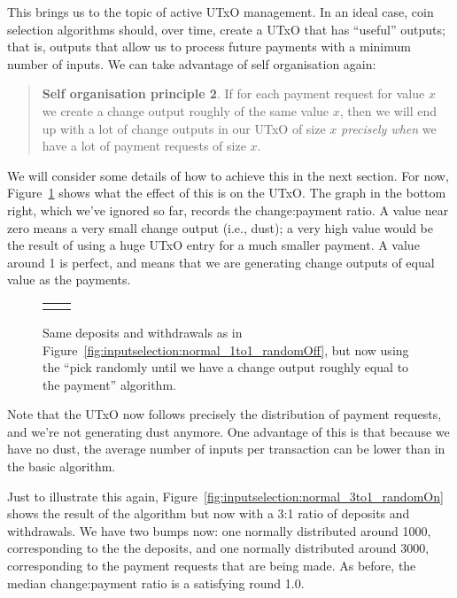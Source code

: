\documentclass{article}
\theoremstyle{definition}{
  \newtheorem{lemma}{Lemma}[section] %
  \newtheorem{definition}[lemma]{Definition}
}
\theoremstyle{theorem}{
  \newtheorem{invariant}[lemma]{Invariant}
  \newtheorem{proofobligation}[lemma]{Proof Obligation}
}
\numberwithin{equation}{lemma}
\begin{document}
This brings us to the topic of active UTxO management. In an ideal case, coin
selection algorithms should, over time, create a UTxO that has ``useful'' outputs;
that is, outputs that allow us to process future payments with a minimum number
of inputs. We can take advantage of self organisation again:
%
\begin{quote}
\textbf{Self organisation principle 2}. If for each payment request for value
$x$ we create a change output roughly of the same value $x$, then we will end up
with a lot of change outputs in our UTxO of size $x$ \emph{precisely when} we
have a lot of payment requests of size $x$.
\end{quote}
%
We will consider some details of how to achieve this in the next section. For
now, Figure~\ref{fig:inputselection:normal_1to1_randomOn} shows what the effect
of this is on the UTxO. The graph in the bottom right, which we've ignored so
far, records the change:payment ratio. A value near zero means a very small
change output (i.e., dust); a very high value would be the result of using a
huge UTxO entry for a much smaller payment. A value around 1 is perfect, and
means that we are generating change outputs of equal value as the payments.

\begin{figure}[p]
\begin{center}
\scriptsize
\begin{tabular}{ll}
 &

\end{tabular}
\end{center}
\caption{\label{fig:inputselection:normal_1to1_randomOn}
  Same deposits and withdrawals as in
  Figure~\ref{fig:inputselection:normal_1to1_randomOff}, but now using the
  ``pick randomly until we have a change output roughly equal to the payment''
  algorithm.
}
\end{figure}

Note that the UTxO now follows precisely the distribution of payment requests,
and we're not generating dust anymore. One advantage of this is that because
we have no dust, the average number of inputs per transaction can be lower
than in the basic algorithm.

Just to illustrate this again,
Figure~\ref{fig:inputselection:normal_3to1_randomOn} shows the result of the
algorithm but now with a 3:1 ratio of deposits and withdrawals. We have two
bumps now: one normally distributed around 1000, corresponding to the the
deposits, and one normally distributed around 3000, corresponding to the payment
requests that are being made. As before, the median change:payment ratio is a
satisfying round 1.0.
\end{document}
